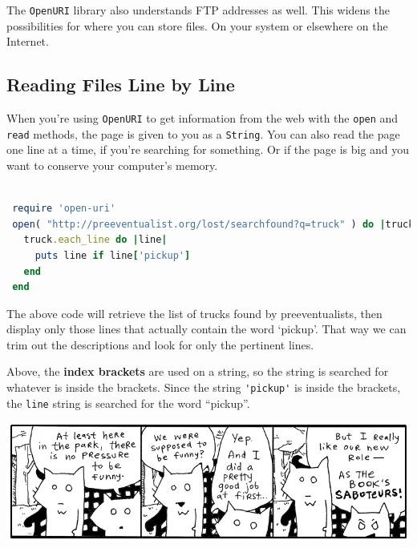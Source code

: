 \documentclass[10pt,twoside]{report}
\begin{document}
The \lstinline[breaklines=true]|OpenURI| library also understands FTP
addresses as well.  This widens the possibilities for where you can
store files.  On your system or elsewhere on the Internet.



\subsection{Reading Files Line by Line}



When you're using \lstinline[breaklines=true]|OpenURI| to get
information from the web with the \lstinline[breaklines=true]|open|
and \lstinline[breaklines=true]|read| methods, the page is given to
you as a \lstinline[breaklines=true]|String|.  You can also read the
page one line at a time, if you're searching for something.  Or if the
page is big and you want to conserve your computer's memory.


\begin{lstlisting}[basicstyle=\ttfamily\color{basiccolor},
    commentstyle = \ttfamily\color{commentcolor},
    keywordstyle=\ttfamily\color{keywordscolor},
    stringstyle=\color{stringcolor},
    language=Ruby,
    basicstyle=\small\ttfamily,
    showstringspaces=false,
  ]

 require 'open-uri'
 open( "http://preeventualist.org/lost/searchfound?q=truck" ) do |truck|
   truck.each_line do |line|
     puts line if line['pickup']
   end
 end

\end{lstlisting}


The above code will retrieve the list of trucks found by
preeventualists, then display only those lines that actually contain
the word `pickup'. That way we can trim out the descriptions and look
for only the pertinent lines.

Above, the {\bf index brackets} are used on a string, so the string is
searched for whatever is inside the brackets.  Since the string
\lstinline[breaklines=true]|'pickup'| is inside the brackets, the
\lstinline[breaklines=true]|line| string is searched for the word
``pickup''.

	\includegraphics[width=1.0\textwidth]{cache/59.png}
\end{document}
